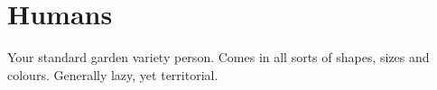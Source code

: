 \section{Humans}
Your standard garden variety person.
Comes in all sorts of shapes, sizes and colours.
Generally lazy, yet territorial.